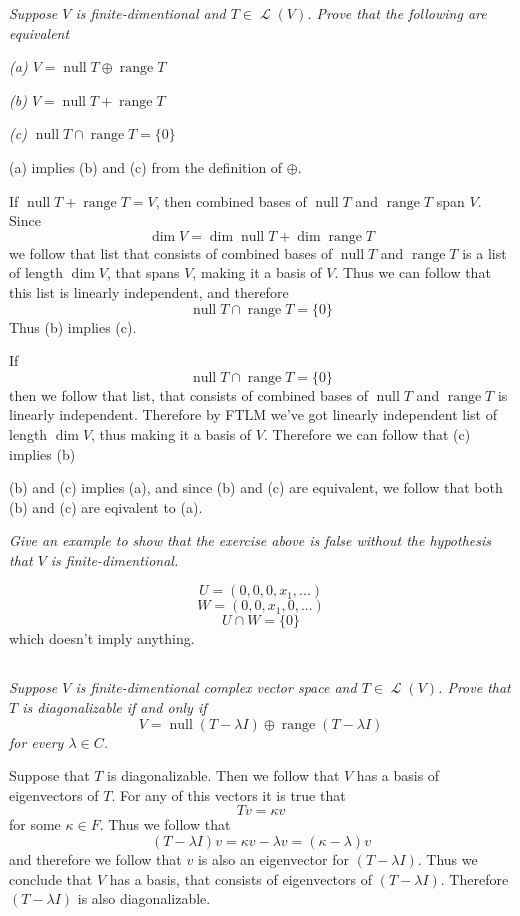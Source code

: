 \documentclass[11pt,oneside,titlepage]{book}
\DeclareMathOperator \map {\mathcal {L}}
\DeclareMathOperator \ns {null}
\DeclareMathOperator \range {range}
\begin{document}
\textit{Suppose $V$ is finite-dimentional and $T \in \map(V)$. Prove that the following are
  equivalent}

\textit{(a) $V = \ns T \oplus \range T$}

\textit{(b) $V = \ns T + \range T$}

\textit{(c) $\ns T \cap \range T = \{0\}$}

(a) implies (b) and (c) from the definition of $\oplus$. 

If $\ns T + \range T = V$, then combined bases of $\ns T$ and $\range T$ span $V$. Since
$$\dim V = \dim \ns T + \dim \range T$$
we follow that list that consists of combined bases of $\ns T$ and $\range T$ is
a list of length $\dim V$, that spans $V$, making it a basis of $V$. Thus we can follow that
this list is linearly independent, and therefore
$$\ns T \cap \range T = \{0\}$$
Thus (b) implies (c).

If
$$\ns T \cap \range T = \{0\}$$
then we follow that list, that consists of combined  bases of $\ns T$ and $\range T$ is
linearly independent. Therefore by FTLM  we've got linearly independent list of length $\dim V$,
thus making it a basis of $V$. Therefore we can follow that
(c) implies (b)

(b) and (c) implies (a), and since (b) and (c) are equivalent, we follow that both (b) and (c)
are eqivalent to (a).

\textit{Give an example to show that the exercise above is false without the hypothesis that
  $V$ is finite-dimentional.}

$$U = (0, 0, 0, x_1, ...)$$
$$W = (0, 0, x_1, 0 , ...)$$
$$U \cap W = \{0\}$$
which doesn't imply anything.


\subsection{}

\textit{Suppose $V$ is finite-dimentional complex vector space and $T \in \map(V)$. Prove that
  $T$ is diagonalizable if and only if }
$$V = \ns (T - \lambda I) \oplus \range (T - \lambda I)$$
\textit{for every $\lambda \in C$.}

Suppose that $T$ is diagonalizable. Then we follow that $V$ has a basis of eigenvectors of
$T$. For any of this vectors it is true that 
$$Tv = \kappa v$$
for some $\kappa \in F$. Thus we follow that 
$$(T - \lambda I)v = \kappa v - \lambda v = (\kappa - \lambda)v$$
and therefore we follow that $v$ is also an eigenvector for $(T - \lambda I)$. Thus
we conclude that $V$ has a basis, that consists of eigenvectors of $(T - \lambda I)$. Therefore
$(T - \lambda I)$ is also diagonalizable.
\end{document}
